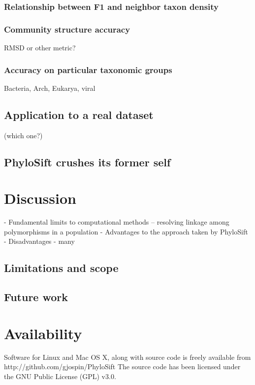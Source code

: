 \documentclass[10pt]{article}
\begin{document}
\subsubsection*{Relationship between F1 and neighbor taxon density}

\subsubsection*{Community structure accuracy}
RMSD or other metric?

\subsubsection*{Accuracy on particular taxonomic groups}
Bacteria, Arch, Eukarya, viral

\subsection*{Application to a real dataset}
 (which one?)

\subsection*{PhyloSift crushes its former self}


\section*{Discussion}
  - Fundamental limits to computational methods -- resolving linkage among polymorphisms in a population
  - Advantages to the approach taken by PhyloSift
  - Disadvantages
    - many


\subsection*{Limitations and scope}


\subsection*{Future work}


\section*{Availability}
Software for Linux and Mac OS X, along with source code is freely available from http://github.com/gjospin/PhyloSift
The source code has been licensed under the GNU Public License (GPL) v3.0.
\end{document}
